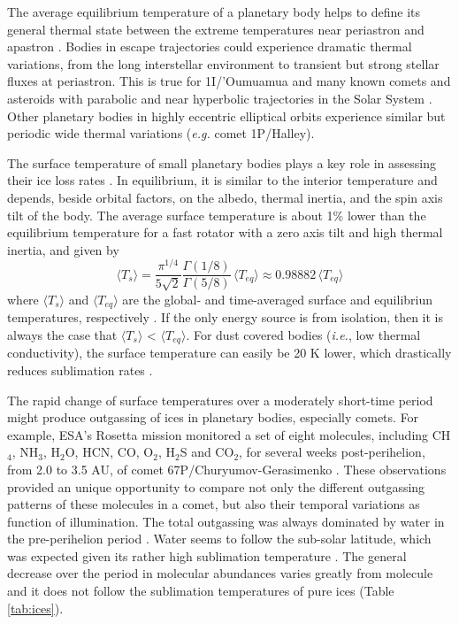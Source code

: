 \documentclass[a4paper,fleqn,usenatbib]{mnras}
\begin{document}
The average equilibrium temperature of a planetary body helps to define its general thermal state between the extreme temperatures near periastron and apastron \citep{2017ApJ...837L...1M}. Bodies in escape trajectories could experience dramatic thermal variations, from the long interstellar environment to transient but strong stellar fluxes at periastron. This is true for 1I/'Oumuamua and many known comets and asteroids with parabolic and near hyperbolic trajectories in the Solar System \citep{SSD(2018)}. Other planetary bodies in highly eccentric elliptical orbits experience similar but periodic wide thermal variations (\emph{e.g.} comet 1P/Halley).

The surface temperature of small planetary bodies plays a key role in assessing their ice loss rates \citep{2018arXiv180201293S}. In equilibrium, it is similar to the interior temperature and depends, beside orbital factors, on the albedo, thermal inertia, and the spin axis tilt of the body. The average surface temperature is about 1\% lower than the equilibrium temperature for a fast rotator with a zero axis tilt and high thermal inertia, and given by
\begin{equation} \label{eq:Ts}
\langle T_s \rangle = \frac{\pi^{1/4}}{5\sqrt{2}} \frac{\Gamma(1/8)}{\Gamma(5/8)} \, \langle T_{eq} \rangle \approx 0.98882 \, \langle T_{eq} \rangle
\end{equation}
where $\langle T_s \rangle$ and $\langle T_{eq} \rangle$ are the global- and time-averaged surface and equilibriun temperatures, respectively \citep{2018arXiv180201293S}. If the only energy source is from isolation, then it is
always the case that $\langle T_s \rangle$ < $\langle T_{eq} \rangle$. For dust covered bodies (\emph{i.e.}, low thermal conductivity), the surface temperature
can easily be 20 K lower, which drastically reduces sublimation rates \citep{2008ApJ...682..697S, 2016Icar..276...88S}.

The rapid change of surface temperatures over a moderately short-time period might produce outgassing of ices in planetary bodies, especially comets. For example, ESA's Rosetta mission monitored a set of eight molecules, including CH$_4$, NH$_3$, H$_2$O, HCN, CO, O$_2$, H$_2$S and CO$_2$, for several weeks post-perihelion, from 2.0 to 3.5 AU, of comet 67P/Churyumov-Gerasimenko \citep{2017MNRAS.469S.108G}. These observations provided an unique opportunity to compare not only the different outgassing patterns of these molecules in a comet, but also their temporal variations as function of illumination. The total outgassing was always dominated by water in the pre-perihelion period \citep{2016MNRAS.462S.156F}. Water seems to follow the sub-solar latitude, which was expected given its rather high sublimation temperature \citep{2016MNRAS.462S.491H}. The general decrease over the period in molecular abundances varies greatly from molecule and it does not follow the sublimation temperatures of pure ices (Table \ref{tab:ices}).
\end{document}
